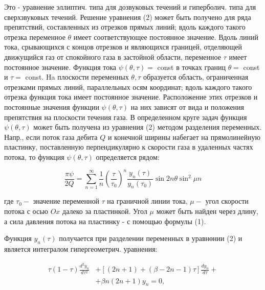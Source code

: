 \documentclass[10pt]{article}
\begin{document}
Это - уравнение эллиптич. типа для дозвуковых течений и гиперболич. типа для сверхзвуковых течений. Решение уравнения (2) может быть получено для ряда препятствий, составленных из отрезков прямых линий; вдоль каждого такого отрезка переменное $\theta$ имеет соответствующее постоянное значение. Вдоль линий тока, срывающихся с концов отрезков и являющихся границей, отделяющей движущийся газ от спокойного газа в застойной области, переменное $\tau$ имеет постоянное значение. Функция тока $\psi(\theta, \tau)=$ const в точках границ $\theta=$ const и $\tau=$ const. Ha плоскости переменных $\theta, \tau$ образуется область, ограниченная отрезками прямых линий, параллельных осям координат; вдоль каждого такого отрезка функция тока имеет постоянное значение. Расположение этих отрезков и постоянные значения функции $\psi(\theta, \tau)$ на них зависят от вида и положения препятствия на плоскости течения газа. В определенном круге задач функция $\psi(\theta, \tau)$ может быть получена из уравнения (2) методом разделения переменных. Напр., если поток газа дебита $Q$ и конечной ширины набегает на прямолинейную пластинку, поставленную перпендикулярно к скорости газа в удаленных частях потока, то функция $\psi(\theta, \tau)$ определяется рядом:



\[

\frac{\pi \psi}{2 Q}=\sum_{n=1}^{\infty} \frac{1}{n}\left(\frac{\tau}{\tau_{0}}\right)^{n} \frac{y_{n}(\tau)}{y_{n}\left(\tau_{0}\right)} \sin 2 n \theta \sin ^{2} \mu n

\]



где $\tau_{0}-$ значение переменной $\tau$ на граничной линии тока, $\mu-$ угол скорости потока с осью $O x$ далеко за пластинкой. Угол $\mu$ может быть найден через длину, а сила давления потока на пластинку - с помощью формулы (1).



Функция $y_{n}(\tau)$ получается при разделении переменных в уравнөнии (2) и является интегралом гипергеометрич. уравнения:



\[

\begin{aligned}

\tau(1-\tau) \frac{d^{2} y_{n}}{d \tau^{2}} & +[(2 n+1)+(\beta-2 n-1) \tau] \frac{d y_{n}}{d \tau}+ \\

& +\beta n(2 n+1) y_{n}=0,

\end{aligned}

\]
\end{document}
